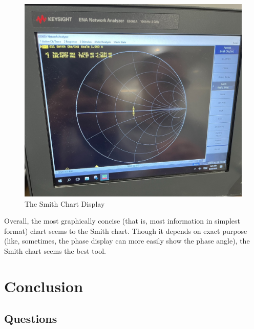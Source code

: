 \documentclass[
	letterpaper, %
	10pt, %
]{CSUniSchoolLabReport}
\begin{document}
  \begin{figure}[H]
    \centering
    \includegraphics[width=.75\textwidth]{Figures/Lab One/Smith.png}
    \caption{The Smith Chart Display}
    \label{fig:13}
  \end{figure}

  Overall, the most graphically concise (that is, most information in simplest format) chart seems to the Smith chart. Though it depends on exact purpose (like, sometimes, the phase display can more easily show the phase angle), the Smith chart seems the best tool.

\section{Conclusion}

\subsection{Questions}
\end{document}
